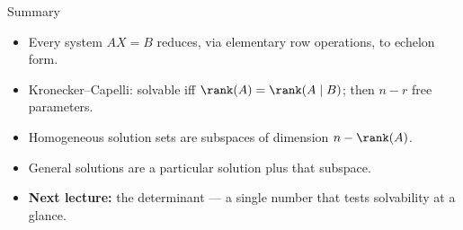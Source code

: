 \begin{frame}{Summary}
\begin{itemize}
\item Every system $AX=B$ reduces, via elementary row operations, to echelon form.
\pause
\item Kronecker--Capelli: solvable iff $\rank(A)=\rank(A\mid B)$; then $n-r$ free parameters.
\pause
\item Homogeneous solution sets are subspaces of dimension $n-\rank(A)$.
\pause
\item General solutions are a particular solution plus that subspace.
\pause
\item \textbf{Next lecture:} the determinant — a single number that tests solvability at a glance.
\end{itemize}
\end{frame}
